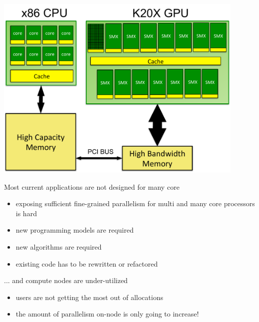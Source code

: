 \documentclass[aspectratio=43]{beamer}
\begin{document}
\begin{frame}[fragile]{}
    \begin{center}
        \includegraphics[width=0.9\textwidth]{./images/node.pdf}
    \end{center}
\end{frame}


\begin{frame}[fragile]{}
    \begin{info}{Most current applications are not designed for many core}
        \begin{itemize}
            \item exposing sufficient fine-grained parallelism for multi and many core processors is hard
            \item new programming models are required
            \item new algorithms are required
            \item existing code has to be rewritten or refactored
        \end{itemize}
    \end{info}

    \begin{info}{... and compute nodes are under-utilized}
        \begin{itemize}
            \item users are not getting the most out of allocations
            \item the amount of parallelism on-node is only going to increase!
        \end{itemize}
    \end{info}
\end{frame}
\end{document}
